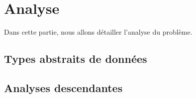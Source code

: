 \chapter{Analyse}

Dans cette partie, nous allons détailler l'analyse du problème.

\section{Types abstraits de données}















\section{Analyses descendantes}



